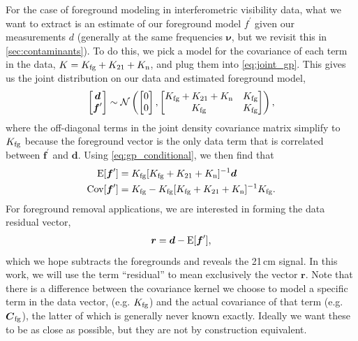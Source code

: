 \documentclass[a4paper,fleqn,usenatbib]{mnras}
\def\d{\boldsymbol{d}}
\def\f{\boldsymbol{f}}
\def\r{\boldsymbol{r}}
\def\Cfg{\boldsymbol{C}_{\rm fg}}
\def\Cov{{\rm Cov}}
\def\Exp{{\rm E}}
\def\bnu{\boldsymbol{\nu}}
\def\Kto{K_{\rm 21}}
\def\Kfg{K_{\rm fg}}
\def\Kn{K_{\rm n}}
\begin{document}
For the case of foreground modeling in interferometric visibility data, what we want to extract is an estimate of our foreground model $f^\prime$ given our measurements $d$ (generally at the same frequencies $\bnu$, but we revisit this in \autoref{sec:contaminants}).
To do this, we pick a model for the covariance of each term in the data, $K = \Kfg + \Kto + \Kn$, and plug them into \autoref{eq:joint_gp}.
This gives us the joint distribution on our data and estimated foreground model,
\begin{align}
\begin{bmatrix}\d \\ \f^\prime\end{bmatrix} \sim \mathcal{N}\left(\begin{bmatrix}0\\ 0\end{bmatrix},
\begin{bmatrix}\Kfg+\Kto+\Kn & \Kfg\\ \Kfg & \Kfg\end{bmatrix}\right),
\end{align}
where the off-diagonal terms in the joint density covariance matrix simplify to $\Kfg$ because the foreground vector is the only data term that is correlated between $\f^\prime$ and $\d$.
Using \autoref{eq:gp_conditional}, we then find that
\begin{align}
\label{eq:fg_conditional}
\Exp[\f^\prime] &= \Kfg [\Kfg+\Kto+\Kn]^{-1}\d \\
\label{eq:fg_cov_conditional}
\Cov[\f^\prime] &= \Kfg - \Kfg[\Kfg+\Kto+\Kn]^{-1}\Kfg.
\end{align}
For foreground removal applications, we are interested in forming the data residual vector,
\begin{align}
\label{eq:res}
\r = \d - \Exp[\f^\prime],
\end{align}
which we hope subtracts the foregrounds and reveals the 21\,cm signal.
In this work, we will use the term ``residual'' to mean exclusively the vector $\r$.
Note that there is a difference between the covariance kernel we choose to model a specific term in the data vector, (e.g. $K_{\rm fg}$) and the actual covariance of that term (e.g. $\Cfg$), the latter of which is generally never known exactly.
Ideally we want these to be as close as possible, but they are not by construction equivalent.
\end{document}
